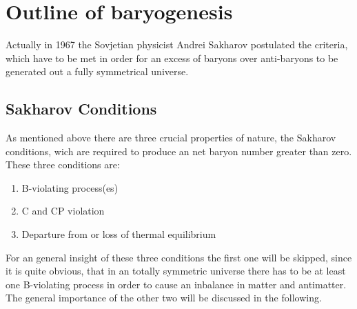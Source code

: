 \section{Outline of baryogenesis}
Actually in 1967 the Sovjetian physicist Andrei Sakharov postulated the criteria, which have to be met in order for an excess of baryons over anti-baryons to be generated out a fully symmetrical universe.
\subsection{Sakharov Conditions}
As mentioned above there are three crucial properties of nature, the Sakharov conditions, wich are required to produce an net baryon number greater than zero. These three conditions are:
\begin{enumerate}
	\item B-violating process(es)
	\item C and CP violation
	\item Departure from or loss of thermal equilibrium
\end{enumerate}
For an general insight of these three conditions the first one will be skipped, since it is quite obvious, that in an totally symmetric universe there has to be at least one B-violating process in order to cause an inbalance in matter and antimatter. \newline
The general importance of the other two will be discussed in the following.
